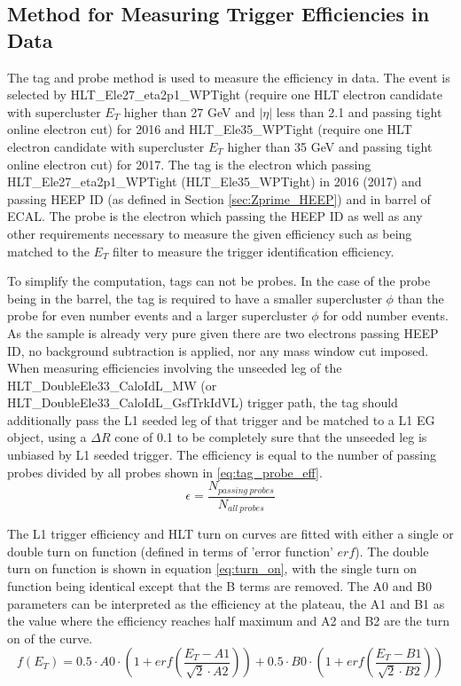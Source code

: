 \subsection{Method for Measuring Trigger Efficiencies in Data}\label{sec:trigger_efficiency_method}
The tag and probe method \cite{CMS-AN-2009-111} is used to measure the efficiency in data. The event is selected by HLT\_Ele27\_eta2p1\_WPTight (require one HLT electron candidate with supercluster $E_{T}$ higher than 27 GeV and $|\eta|$ less than 2.1 and passing tight online electron cut) for 2016 and HLT\_Ele35\_WPTight (require one HLT electron candidate with supercluster $E_{T}$ higher than 35 GeV and passing tight online electron cut) for 2017. The tag is the electron which passing HLT\_Ele27\_eta2p1\_WPTight (HLT\_Ele35\_WPTight) in 2016 (2017) and passing HEEP ID (as defined in Section \ref{sec:Zprime_HEEP}) and in barrel of ECAL. The probe is the electron which passing the HEEP ID as well as any other requirements necessary to measure the given efficiency such as being matched to the $E_{T}$ filter to measure the trigger identification efficiency.

To simplify the computation, tags can not be probes. In the case of the probe being in the barrel, the tag is required to have a smaller supercluster $\phi$ than the probe for even number events and a larger supercluster $\phi$ for odd number events. As the sample is already very pure given there are two electrons passing HEEP ID, no background subtraction is applied, nor any mass window cut imposed. When measuring efficiencies involving the unseeded leg of the HLT\_DoubleEle33\_CaloIdL\_MW (or HLT\_DoubleEle33\_CaloIdL\_GsfTrkIdVL) trigger path, the tag should additionally pass the L1 seeded leg of that trigger and be matched to a L1 EG object, using a $\Delta R$ cone of 0.1 to be completely sure that the unseeded leg is unbiased by L1 seeded trigger. The efficiency is equal to the number of passing probes divided by all probes shown in \ref{eq:tag_probe_eff}.
\begin{equation}
\epsilon=\frac{N_{passing~probes}}{N_{all~probes}}
\label{eq:tag_probe_eff}
\end{equation}

The L1 trigger efficiency and HLT turn on curves are fitted with either a single or double turn on function (defined in terms of 'error function' $erf$). The double turn on function is shown in equation \ref{eq:turn_on}, with the single turn on function being identical except that the B terms are removed. The A0 and B0 parameters can be interpreted as the efficiency at the plateau, the A1 and B1 as the value where the efficiency reaches half maximum and A2 and B2 are the turn on of the curve.
\begin{equation}
f(E_{T})=0.5\cdot A0\cdot(1+erf(\frac{E_{T}-A1}{\sqrt{2}\cdot A2}))+0.5\cdot B0\cdot(1+erf(\frac{E_{T}-B1}{\sqrt{2}\cdot B2}))
\label{eq:turn_on}
\end{equation}

